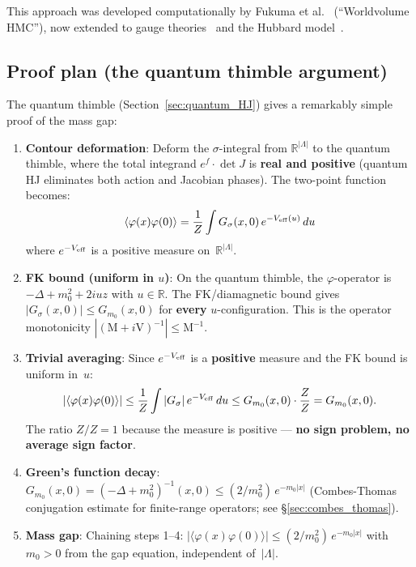 \documentclass[12pt]{article}
\theoremstyle{definition}
\theoremstyle{remark}
\newcommand{\R}{\mathbb{R}}
\newcommand{\ph}{\varphi}
\newcommand{\La}{\Lambda}
\begin{document}
This approach was developed computationally by
Fukuma et al.~\cite{Fukuma20,Fukuma23} (``Worldvolume HMC''),
now extended to gauge theories~\cite{Fukuma26} and the Hubbard
model~\cite{Fukuma25b}.

\subsection{Proof plan (the quantum thimble argument)}

The quantum thimble (Section~\ref{sec:quantum_HJ}) gives a
remarkably simple proof of the mass gap:

\begin{enumerate}
\item \textbf{Contour deformation}: Deform the $\sigma$-integral
  from $\R^{|\La|}$ to the quantum thimble, where the total
  integrand $e^f \cdot \det J$ is \textbf{real and positive}
  (quantum HJ eliminates both action and Jacobian phases).
  The two-point function becomes:
  \begin{equation}
    \langle\ph(x)\ph(0)\rangle
      = \frac{1}{Z}\int G_\sigma(x,0)\,e^{-V_{\rm eff}(u)}\,du
  \end{equation}
  where $e^{-V_{\rm eff}}$ is a positive measure on~$\R^{|\La|}$.

\item \textbf{FK bound (uniform in $u$)}: On the quantum thimble,
  the $\ph$-operator is $-\Delta + m_0^2 + 2iuz$ with $u \in \R$.
  The FK/diamagnetic bound gives
  $|G_\sigma(x,0)| \le G_{m_0}(x,0)$ for \textbf{every}
  $u$-configuration. This is the operator monotonicity
  $|(\text{M}+i\text{V})^{-1}| \le \text{M}^{-1}$.

\item \textbf{Trivial averaging}: Since $e^{-V_{\rm eff}}$ is a
  \textbf{positive} measure and the FK bound is uniform in~$u$:
  \begin{equation}
    |\langle\ph(x)\ph(0)\rangle|
      \le \frac{1}{Z}\int |G_\sigma|\,e^{-V_{\rm eff}}\,du
      \le G_{m_0}(x,0)\cdot\frac{Z}{Z}
      = G_{m_0}(x,0).
  \end{equation}
  The ratio $Z/Z = 1$ because the measure is positive ---
  \textbf{no sign problem, no average sign factor}.

\item \textbf{Green's function decay}: $G_{m_0}(x,0) =
  (-\Delta+m_0^2)^{-1}(x,0) \le (2/m_0^2)\,e^{-m_0|x|}$
  (Combes-Thomas conjugation estimate for finite-range operators;
  see \S\ref{sec:combes_thomas}).

\item \textbf{Mass gap}: Chaining steps 1--4:
  $|\langle\ph(x)\ph(0)\rangle| \le (2/m_0^2)\,e^{-m_0|x|}$
  with $m_0 > 0$ from the gap equation, independent of~$|\La|$.
\end{enumerate}
\end{document}
